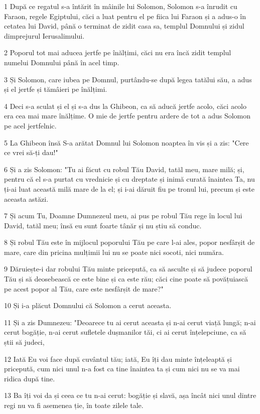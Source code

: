 \par 1 După ce regatul s-a întărit în mâinile lui Solomon, Solomon s-a înrudit cu Faraon, regele Egiptului, căci a luat pentru el pe fiica lui Faraon și a adus-o în cetatea lui David, până o terminat de zidit casa sa, templul Domnului și zidul dimprejurul Ierusalimului.
\par 2 Poporul tot mai aducea jertfe pe înălțimi, căci nu era încă zidit templul numelui Domnului până în acel timp.
\par 3 Și Solomon, care iubea pe Domnul, purtându-se după legea tatălui său, a adus și el jertfe și tămâieri pe înălțimi.
\par 4 Deci s-a sculat și el și s-a dus la Ghibeon, ca să aducă jertfe acolo, căci acolo era cea mai mare înălțime. O mie de jertfe pentru ardere de tot a adus Solomon pe acel jertfelnic.
\par 5 La Ghibeon însă S-a arătat Domnul lui Solomon noaptea în vis și a zis: "Cere ce vrei să-ți dau!"
\par 6 Și a zis Solomon: "Tu ai făcut cu robul Tău David, tatăl meu, mare milă; și, pentru că el s-a purtat cu vrednicie și cu dreptate și inimă curată înaintea Ta, nu ți-ai luat această milă mare de la el; și i-ai dăruit fiu pe tronul lui, precum și este aceasta astăzi.
\par 7 Și acum Tu, Doamne Dumnezeul meu, ai pus pe robul Tău rege în locul lui David, tatăl meu; însă eu sunt foarte tânăr și nu știu să conduc.
\par 8 Și robul Tău este în mijlocul poporului Tău pe care l-ai ales, popor nesfârșit de mare, care din pricina mulțimii lui nu se poate nici socoti, nici număra.
\par 9 Dăruiește-i dar robului Tău minte pricepută, ca să asculte și să judece poporul Tău și să deosebească ce este bine și ca este rău; căci cine poate să povățuiască pe acest popor al Tău, care este nesfârșit de mare?"
\par 10 Și i-a plăcut Domnului că Solomon a cerut aceasta.
\par 11 Și a zis Dumnezeu: "Deoarece tu ai cerut aceasta și n-ai cerut viață lungă; n-ai cerut bogăție, n-ai cerut sufletele dușmanilor tăi, ci ai cerut înțelepciune, ca să știi să judeci,
\par 12 Iată Eu voi face după cuvântul tău; iată, Eu îți dau minte înțeleaptă și pricepută, cum nici unul n-a fost ca tine înaintea ta și cum nici nu se va mai ridica după tine.
\par 13 Ba îți voi da și ceea ce tu n-ai cerut: bogăție și slavă, așa încât nici unul dintre regi nu va fi asemenea ție, în toate zilele tale.
